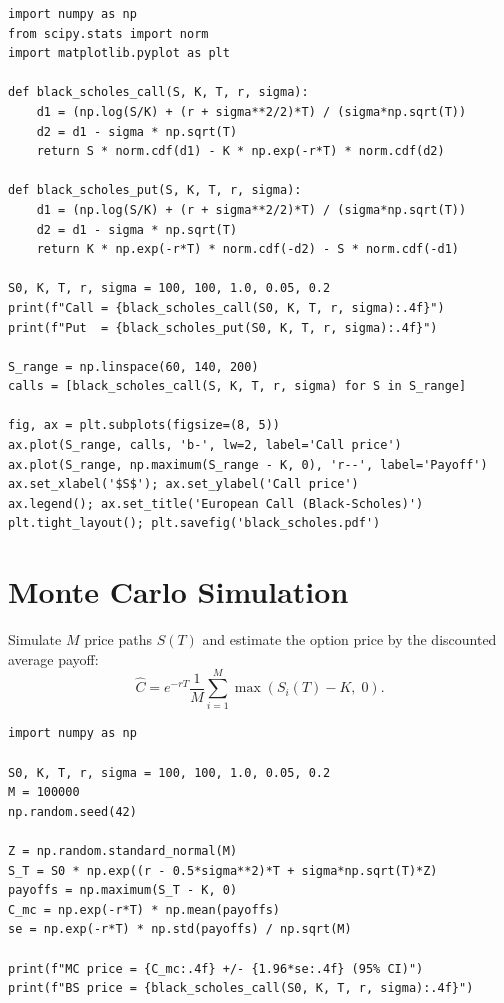 \begin{codeblock}[title=\textbf{Black--Scholes formula in Python}]
\begin{verbatim}
import numpy as np
from scipy.stats import norm
import matplotlib.pyplot as plt

def black_scholes_call(S, K, T, r, sigma):
    d1 = (np.log(S/K) + (r + sigma**2/2)*T) / (sigma*np.sqrt(T))
    d2 = d1 - sigma * np.sqrt(T)
    return S * norm.cdf(d1) - K * np.exp(-r*T) * norm.cdf(d2)

def black_scholes_put(S, K, T, r, sigma):
    d1 = (np.log(S/K) + (r + sigma**2/2)*T) / (sigma*np.sqrt(T))
    d2 = d1 - sigma * np.sqrt(T)
    return K * np.exp(-r*T) * norm.cdf(-d2) - S * norm.cdf(-d1)

S0, K, T, r, sigma = 100, 100, 1.0, 0.05, 0.2
print(f"Call = {black_scholes_call(S0, K, T, r, sigma):.4f}")
print(f"Put  = {black_scholes_put(S0, K, T, r, sigma):.4f}")

S_range = np.linspace(60, 140, 200)
calls = [black_scholes_call(S, K, T, r, sigma) for S in S_range]

fig, ax = plt.subplots(figsize=(8, 5))
ax.plot(S_range, calls, 'b-', lw=2, label='Call price')
ax.plot(S_range, np.maximum(S_range - K, 0), 'r--', label='Payoff')
ax.set_xlabel('$S$'); ax.set_ylabel('Call price')
ax.legend(); ax.set_title('European Call (Black-Scholes)')
plt.tight_layout(); plt.savefig('black_scholes.pdf')
\end{verbatim}
\end{codeblock}

\section{Monte Carlo Simulation}
\label{sec:monte_carlo}

\begin{definition}
Simulate $M$ price paths $S(T)$ and estimate the option price by
the discounted average payoff:
\[
  \hat{C} = e^{-rT}\frac{1}{M}\sum_{i=1}^M \max(S_i(T)-K,\;0).
\]
\end{definition}

\begin{codeblock}[title=\textbf{Monte Carlo for European call}]
\begin{verbatim}
import numpy as np

S0, K, T, r, sigma = 100, 100, 1.0, 0.05, 0.2
M = 100000
np.random.seed(42)

Z = np.random.standard_normal(M)
S_T = S0 * np.exp((r - 0.5*sigma**2)*T + sigma*np.sqrt(T)*Z)
payoffs = np.maximum(S_T - K, 0)
C_mc = np.exp(-r*T) * np.mean(payoffs)
se = np.exp(-r*T) * np.std(payoffs) / np.sqrt(M)

print(f"MC price = {C_mc:.4f} +/- {1.96*se:.4f} (95% CI)")
print(f"BS price = {black_scholes_call(S0, K, T, r, sigma):.4f}")
\end{verbatim}
\end{codeblock}

